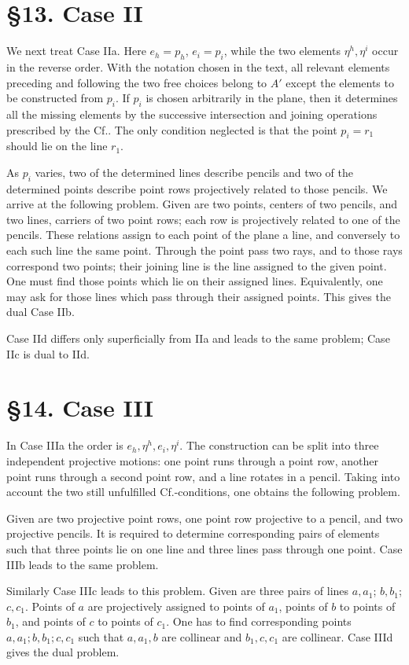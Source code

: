 \documentclass[11pt]{article}
\newcommand{\Cf}{\textup{Cf.}}
\begin{document}
\section*{\S 13. Case II}
We next treat Case IIa. Here $e_h=p_h$, $e_i=p_i$, while the two elements $\eta^h,\eta^i$ occur in the reverse order. With the notation chosen in the text, all relevant elements preceding and following the two free choices belong to $A'$ except the elements to be constructed from $p_i$. If $p_i$ is chosen arbitrarily in the plane, then it determines all the missing elements by the successive intersection and joining operations prescribed by the \Cf. The only condition neglected is that the point $p_i=r_1$ should lie on the line $r_1$.

As $p_i$ varies, two of the determined lines describe pencils and two of the determined points describe point rows projectively related to those pencils. We arrive at the following problem. Given are two points, centers of two pencils, and two lines, carriers of two point rows; each row is projectively related to one of the pencils. These relations assign to each point of the plane a line, and conversely to each such line the same point. Through the point pass two rays, and to those rays correspond two points; their joining line is the line assigned to the given point. One must find those points which lie on their assigned lines. Equivalently, one may ask for those lines which pass through their assigned points. This gives the dual Case IIb.

Case IId differs only superficially from IIa and leads to the same problem; Case IIc is dual to IId.

\section*{\S 14. Case III}
In Case IIIa the order is $e_h,\eta^h,e_i,\eta^i$. The construction can be split into three independent projective motions: one point runs through a point row, another point runs through a second point row, and a line rotates in a pencil. Taking into account the two still unfulfilled \Cf-conditions, one obtains the following problem.

Given are two projective point rows, one point row projective to a pencil, and two projective pencils. It is required to determine corresponding pairs of elements such that three points lie on one line and three lines pass through one point. Case IIIb leads to the same problem.

Similarly Case IIIc leads to this problem. Given are three pairs of lines $a,a_1$; $b,b_1$; $c,c_1$. Points of $a$ are projectively assigned to points of $a_1$, points of $b$ to points of $b_1$, and points of $c$ to points of $c_1$. One has to find corresponding points $a,a_1;b,b_1;c,c_1$ such that $a,a_1,b$ are collinear and $b_1,c,c_1$ are collinear. Case IIId gives the dual problem.
\end{document}
